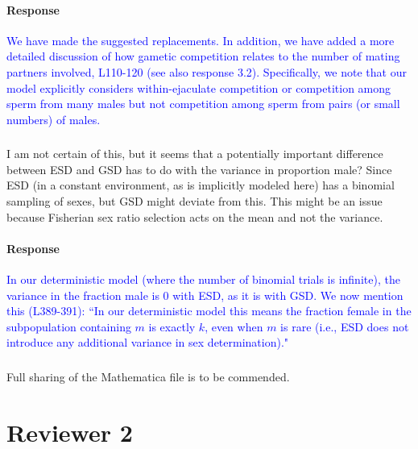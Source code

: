 \documentclass[10pt,letterpaper]{article}
\begin{document}
\noindent\paragraph{Response}
\textcolor{blue}{We have made the suggested replacements.
In addition, we have added a more detailed discussion of how gametic competition relates to the number of mating partners involved, L110-120 (see also response 3.2). 
Specifically, we note that our model explicitly considers within-ejaculate competition or competition among sperm from many males but not competition among sperm from pairs (or small numbers) of males. 
}

\noindent\subsubsection{}
I am not certain of this, but it seems that a potentially important difference between ESD and GSD has to do with the variance in proportion male? Since ESD (in a constant environment, as is implicitly modeled here) has a binomial sampling of sexes, but GSD might deviate from this.  This might be an issue because Fisherian sex ratio selection acts on the mean and not the variance.

\noindent\paragraph{Response}
\textcolor{blue}{In our deterministic model (where the number of binomial trials is infinite), the variance in the fraction male is 0 with ESD, as it is with GSD. 
We now mention this (L389-391): ``In our deterministic model this means the fraction female in the subpopulation containing $m$ is exactly $k$, even when $m$ is rare (i.e., ESD does not introduce any additional variance in sex determination)." 
 }

\noindent\subsubsection{}
Full sharing of the Mathematica file is to be commended.

\section{Reviewer 2}
\end{document}
